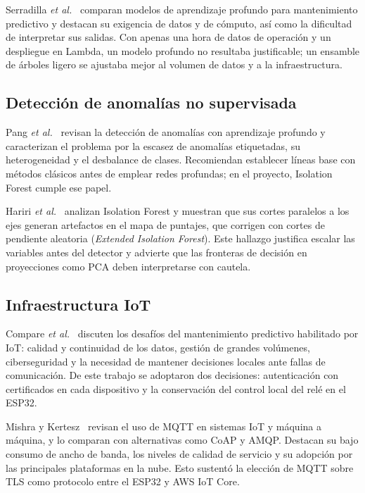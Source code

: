 \documentclass[10pt,twocolumn]{article}
\begin{document}
Serradilla \emph{et al.}~\cite{serradilla2022} comparan modelos de aprendizaje profundo para
mantenimiento predictivo y destacan su exigencia de datos y de cómputo, así como la dificultad de
interpretar sus salidas. Con apenas una hora de datos de operación y un despliegue en Lambda, un
modelo profundo no resultaba justificable; un ensamble de árboles ligero se ajustaba mejor al
volumen de datos y a la infraestructura.

\subsection{Detección de anomalías no supervisada}

Pang \emph{et al.}~\cite{pang2021} revisan la detección de anomalías con aprendizaje profundo y
caracterizan el problema por la escasez de anomalías etiquetadas, su heterogeneidad y el
desbalance de clases. Recomiendan establecer líneas base con métodos clásicos antes de emplear
redes profundas; en el proyecto, Isolation Forest cumple ese papel.

Hariri \emph{et al.}~\cite{hariri2021} analizan Isolation Forest y muestran que sus cortes
paralelos a los ejes generan artefactos en el mapa de puntajes, que corrigen con cortes de
pendiente aleatoria (\emph{Extended Isolation Forest}). Este hallazgo justifica escalar las
variables antes del detector y advierte que las fronteras de decisión en proyecciones como PCA
deben interpretarse con cautela.

\subsection{Infraestructura IoT}

Compare \emph{et al.}~\cite{compare2020} discuten los desafíos del mantenimiento predictivo
habilitado por IoT: calidad y continuidad de los datos, gestión de grandes volúmenes, ciberseguridad
y la necesidad de mantener decisiones locales ante fallas de comunicación. De este trabajo se
adoptaron dos decisiones: autenticación con certificados en cada dispositivo y la conservación del
control local del relé en el ESP32.

Mishra y Kertesz~\cite{mishra2020} revisan el uso de MQTT en sistemas IoT y máquina a máquina, y
lo comparan con alternativas como CoAP y AMQP. Destacan su bajo consumo de ancho de banda, los
niveles de calidad de servicio y su adopción por las principales plataformas en la nube. Esto
sustentó la elección de MQTT sobre TLS como protocolo entre el ESP32 y AWS IoT Core.
\end{document}
